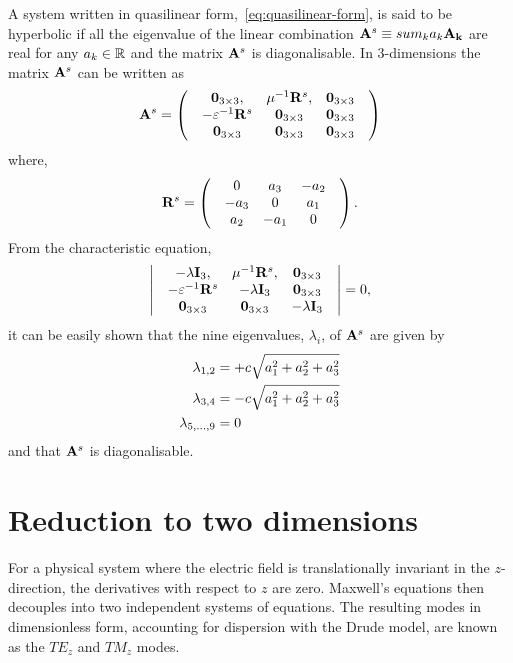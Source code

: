 A system written in quasilinear form,~\eqref{eq:quasilinear-form}, is said to be
hyperbolic if all the eigenvalue of the linear combination $ \mathbf{A}^{s} \equiv
sum_{k} a_{k} \mathbf{A}_\mathbf{k} $ are real for any $a_{k} \in \mathbb{R}$ and
the matrix $\mathbf{A}^{s}$ is diagonalisable. In $3$-dimensions the matrix
$\mathbf{A}^{s}$ can be written as
$$
  \mathbf{A}^{s} =
  \begin{pmatrix}
 & \mathbf{0}_{3\times3} , & \mu^{-1} \mathbf{R}^{s}, & \mathbf{0}_{3\times3} \\
 & - \varepsilon^{-1} \mathbf{R}^{s} & \mathbf{0}_{3\times3} & \mathbf{0}_{3\times3} \\
 & \mathbf{0}_{3\times3} & \mathbf{0}_{3\times3} & \mathbf{0}_{3\times3} 
 & \end{pmatrix}
$$
where,
$$
  \mathbf{R}^{s} =
  \begin{pmatrix}
 & 0 & a_3 & -a_2 \\
 & -a_3 & 0 & a_1 \\
& a_2 & -a_1 & 0 
 & \end{pmatrix} .
$$
From the characteristic equation,
$$
  \begin{vmatrix}
 & -\lambda \mathbf{I}_3, & \mu^{-1} \mathbf{R}^{s}, & \mathbf{0}_{3\times3} \\
 & - \varepsilon^{-1} \mathbf{R}^{s} & -\lambda \mathbf{I}_3 & \mathbf{0}_{3\times3} \\
 & \mathbf{0}_{3\times3} & \mathbf{0}_{3\times3} & -\lambda \mathbf{I}_3
 & \end{vmatrix}
= 0 ,
$$
it can be easily shown that the nine eigenvalues, $\lambda_{i}$, of $\mathbf{A}^{s}$ are given by
\begin{align*}
  \lambda_{1,2} &= + c \sqrt{a_1^2 + a_2^2 + a_3^2} \\
  \lambda_{3,4} &= - c \sqrt{a_1^2 + a_2^2 + a_3^2} \\
\lambda_{5,...,9} &= 0
\end{align*}
and that $\mathbf{A}^{s}$ is diagonalisable.
\section{Reduction to two dimensions}
For a physical system where the electric field is translationally invariant in the $z$-direction, the derivatives with respect to $z$ are zero. Maxwell's equations then decouples into two independent systems of equations. The resulting modes in dimensionless form, accounting for dispersion with the Drude model, are known as the $TE_z$ and $TM_z$ modes.

